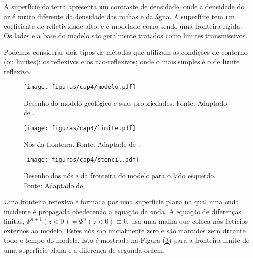 A superfície da terra apresenta um contraste de densidade, onde a densidade do ar é muito diferente da densidade das rochas e da água. A superfície tem um coeficiente de refletividade alto, e é modelado como sendo uma fronteira rígida. Os lados e a base do modelo são geralmente tratados como limites transmissivos. 

Podemos considerar dois tipos de métodos que utilizam as condições de contorno (ou limites): os reflexivos e os não-reflexivos; onde o mais simples é o de limite reflexivo.

\begin{figure}[H]
\centering
\texttt{[image: figuras/cap4/modelo.pdf]}
\caption{Desenho do modelo geológico e suas propriedades. Fonte: Adaptado de \cite{Bording(1997)}.}
\label{fig:modelo1}
\end{figure}

\begin{figure}[H]
\centering
\texttt{[image: figuras/cap4/limite.pdf]}
\caption{Nós da fronteira. Fonte: Adaptado de \cite{Bording(1997)}.}
\label{fig:limite}
\end{figure}

\begin{figure}[H]
\centering
\texttt{[image: figuras/cap4/stencil.pdf]}
\caption{Desenho dos nós e da fronteira do modelo para o lado esquerdo. Fonte: Adaptado de \cite{Bording(1997)}.}
\label{fig:stencil}
\end{figure}

Uma fronteira reflexiva é formada por uma superfície plana na qual uma onda incidente é propagada obedecendo a equação da onda. A equação de diferenças finitas, $\Psi^{n+1}(z<0)=\Psi^{n}(z<0)\equiv 0$, usa uma malha que coloca nós fictícios externos ao modelo. Estes nós são inicialmente zero e são mantidos zero durante todo o tempo do modelo. Isto é mostrado na Figura (\ref{fig:stencil}) para a fronteira limite de uma superfície plana e a diferença de segunda ordem.

